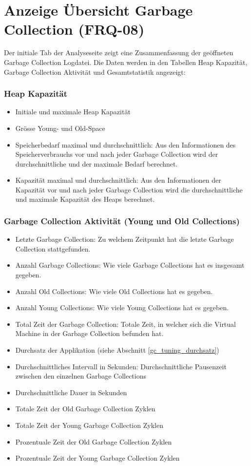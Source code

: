 \section{Anzeige Übersicht Garbage Collection (FRQ-08)}\label{standardreport}
Der initiale Tab der Analyseseite zeigt eine Zusammenfassung der geöffneten Garbage Collection Logdatei. Die Daten werden in den Tabellen Heap Kapazität, Garbage Collection Aktivität und Gesamtstatistik angezeigt:

\subsubsection{Heap Kapazität}
\begin{itemize}
	\item Initiale und maximale Heap Kapazität
	\item Grösse Young- und Old-Space
	\item Speicherbedarf maximal und durchschnittlich: Aus den Informationen des Speicherverbrauchs vor und nach jeder Garbage Collection wird der durchschnittliche und der maximale Bedarf berechnet.
	\item Kapazität maximal und durchschnittlich: Aus den Informationen der Kapazität vor und nach jeder Garbage Collection wird die durchschnittliche und maximale Kapazität des Heaps berechnet.

\end{itemize}
\subsubsection{Garbage Collection Aktivität (Young und Old Collections)}
\begin{itemize}
	\item Letzte Garbage Collection: Zu welchem Zeitpunkt hat die letzte Garbage Collection stattgefunden.
	\item Anzahl Garbage Collections: Wie viele Garbage Collections hat es insgesamt gegeben.
	\item  Anzahl Old Collections: Wie viele Old Collections hat es gegeben.
	\item Anzahl Young Collections: Wie viele Young Collections hat es gegeben.
	\item Total Zeit der Garbage Collection: Totale Zeit, in welcher sich die Virtual Machine in der Garbage Collection befunden hat.
	\item Durchsatz der Applikation (siehe Abschnitt \ref{gc_tuning_durchsatz})

	\item Durchschnittliches Intervall in Sekunden: Durchschnittliche Pausenzeit zwischen den einzelnen Garbage Collections
	\item Durchschnittliche Dauer in Sekunden
	\item Totale Zeit der Old Garbage Collection Zyklen
	\item Totale Zeit der Young Garbage Collection Zyklen
	\item Prozentuale Zeit der Old Garbage Collection Zyklen
	\item Prozentuale Zeit der Young Garbage Collection Zyklen
\end{itemize}	

